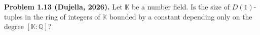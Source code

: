 \textbf{Problem 1.13 (Dujella, 2026).} Let $\mathbb{K}$ be a number field. Is the size of $D(1)$-tuples in the ring of integers of $\mathbb{K}$ bounded by a constant depending only on the degree $[\mathbb{K}:\mathbb{Q}]$?
